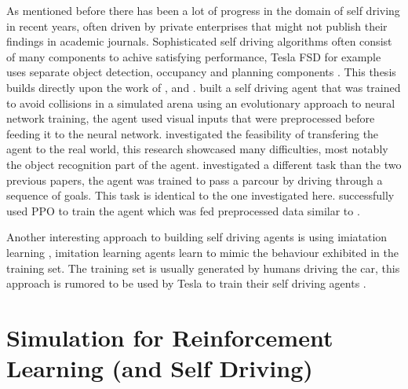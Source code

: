 As mentioned before there has been a lot of progress in the domain of self driving in recent years, often driven by private enterprises that might not publish their findings in academic journals. Sophisticated self driving algorithms often consist of many components to achive satisfying performance, Tesla FSD for example uses separate object detection, occupancy and planning components \autocite{teslaEndToEnd}.
This thesis builds directly upon the work of \autocite{jonas_koenig}, \autocite{merlin_flach} and \autocite{maximilian}. \autocite{jonas_koenig} built a self driving agent that was trained to avoid collisions in a simulated arena using an evolutionary approach to neural network training, the agent used visual inputs that were preprocessed before feeding it to the neural network. \autocite{merlin_flach} investigated the feasibility of transfering the agent to the real world, this research showcased many difficulties, most notably the object recognition part of the agent. \autocite{maximilian} investigated a different task than the two previous papers, the agent was trained to pass a parcour by driving through a sequence of goals. This task is identical to the one investigated here. \autocite{maximilian} successfully used PPO to train the agent which was fed preprocessed data similar to \autocite{jonas_koenig}.

Another interesting approach to building self driving agents is using imiatation learning \autocite{imitation_learning}, imitation learning agents learn to mimic the behaviour exhibited in the training set. The training set is usually generated by humans driving the car, this approach is rumored to be used by Tesla to train their self driving agents \autocite{teslaEndToEnd}.









\section{Simulation for Reinforcement Learning (and Self Driving)}

